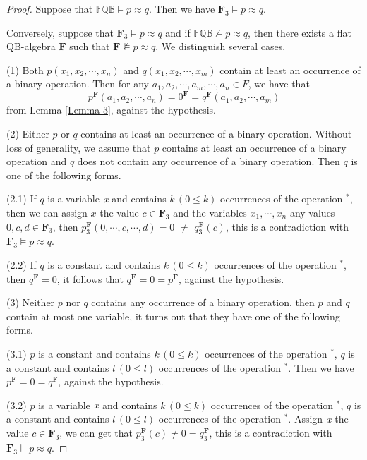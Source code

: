 \documentclass[12pt]{amsart}
\theoremstyle{definition}
\theoremstyle{remark}
\numberwithin{equation}{section}
\begin{document}
\begin{proof}
Suppose that $\mathbb{FQB}\models p\approx q$. Then we have $\mathrm{\mathbf{F}_{3}}\models p\approx q$.

Conversely, suppose that $\mathrm{\mathbf{F}_{3}}\models p\approx q$ and if $\mathbb{FQB}\nvDash p\approx q$, then there exists a flat QB-algebra $\mathbf{F}$ such that $\mathrm{\mathbf{F}}\nvDash p\approx q$. We distinguish several cases.

(1) Both $p(x_{1},x_{2},\cdots,x_{n})$ and $q(x_{1},x_{2},\cdots,x_{m})$ contain at least an occurrence of a binary operation. Then for any $a_{1},a_{2},\cdots,a_{m},\cdots,a_{n}\in F$, we have that
$$
p^\mathbf{F}(a_{1},a_{2},\cdots,a_{n})=0^\mathbf{F}=q^\mathbf{F}(a_{1},a_{2},\cdots,a_{m})
$$
from Lemma \ref{Lemma 3}, against the hypothesis.

(2) Either $p$ or $q$ contains at least an occurrence of a binary operation. Without loss of generality, we assume that $p$ contains at least an occurrence of a binary operation and $q$ does not contain any occurrence of a binary operation. Then $q$ is one of the following forms.

(2.1) If $q$ is a variable $\emph{x}$ and contains $k\,(0\leq k)$ occurrences of the operation $^{*}$, then we can assign $x$ the value $c\in \mathbf{F}_{3}$ and the variables $x_{1},\cdots ,x_{n}$ any values $0,c,d\in \mathbf{F}_{3}$, then $p^\mathbf{F}_{3}(0,\cdots,c,\cdots,d)=0$ $\neq $ $q^\mathbf{F}_{3}(c)$, this is a contradiction with $\mathrm{\mathbf{F}_{3}}\models p\approx q$.

(2.2) If $q$ is a constant and contains $k\,(0\leq k)$ occurrences of the operation $^{*}$, then $q^\mathbf{F}=0$, it follows that $q^\mathbf{F}=0=p^\mathbf{F}$, against the hypothesis.

(3) Neither $p$ nor $q$ contains any occurrence of a binary operation, then $p$ and $q$ contain at most one variable, it turns out that they have one of the following forms.

(3.1) $p$ is a constant and contains $k \,(0\leq k)$ occurrences of the operation $^{*}$, $q$ is a constant and contains $l \, (0\leq l)$ occurrences of the operation $^{*}$. Then we have $p^\mathbf{F}=0=q^\mathbf{F}$, against the hypothesis.

(3.2) $p$ is a variable $\emph{x}$ and contains $k\,(0\leq k)$ occurrences of the operation $^{*}$, $q$ is a constant and contains $l\, (0\leq l)$ occurrences of the operation $^{*}$. Assign $\emph{x}$ the value $c\in \mathbf{F}_{3}$, we can get that $p^\mathbf{F}_{3}(c)\neq 0=q^\mathbf{F}_{3}$, this is a contradiction with
$\mathrm{\mathbf{F}_{3}}\models p\approx q$.


\end{proof}
\end{document}
